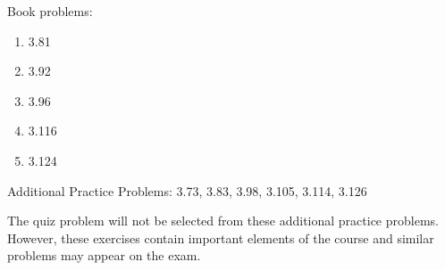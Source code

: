
Book problems:
\begin{enumerate}
  \item 3.81
  \item 3.92
  \item 3.96
  \item 3.116
  \item 3.124
\end{enumerate}

Additional Practice Problems: 3.73, 3.83, 3.98, 3.105, 3.114, 3.126

\noindent The quiz problem will not be selected from these additional practice problems.  However, these exercises contain important elements of the course and similar problems may appear on the exam.

\iftoggle{flagSoln}{%
\vspace{.5cm}
\rule{\textwidth}{.4pt}
\vspace{.5cm}
\textbf{Solution:}
\begin{enumerate}
	\item[3.73:] 
\end{enumerate}
}{%
}%
